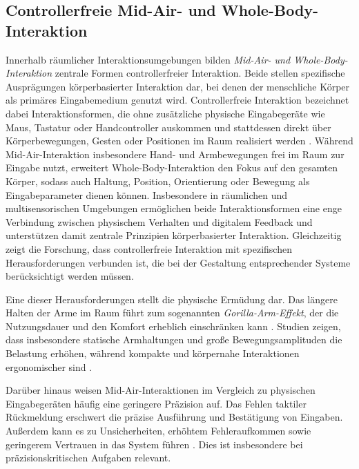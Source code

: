 \subsection{Controllerfreie Mid-Air- und Whole-Body-Interaktion}
\label{sec:rw_midair}
Innerhalb räum\-licher Interaktionsumgebungen bilden \textit{Mid-Air- und Whole-Body-}\-\textit{Interaktion} zentrale Formen controllerfreier Interaktion. Beide stellen spezifische Ausprägungen körper\-basierter Interaktion dar, bei denen der menschliche Körper als primäres Eingabemedium genutzt wird. Controllerfreie Interaktion bezeichnet dabei Interaktionsformen, die ohne zusätzliche physische Eingabegeräte wie Maus, Tastatur oder Handcontroller auskommen und stattdessen direkt über Körperbewegungen, Gesten oder Positionen im Raum realisiert werden \parencite{spittle2023reviewinteractiontechniquesforimmersiveenvironments, gavgiotaki2023gesturebasedinteractionforarsystemsreview}. Während Mid-Air-Interaktion insbesondere Hand- und Armbewegungen frei im Raum zur Eingabe nutzt, erweitert Whole-Body-Interaktion den Fokus auf den gesamten Körper, sodass auch Haltung, Position, Orientierung oder Bewegung als Eingabeparameter dienen können.
Insbesondere in räumlichen und multisensorischen Umgebungen ermög\-lichen beide Interaktionsformen eine enge Verbindung zwischen physischem Verhalten und digitalem Feedback und unterstützen damit zentrale Prinzipien körper\-basierter Interaktion.
Gleichzeitig zeigt die Forschung, dass controllerfreie Interaktion mit spezifischen Herausforderungen verbunden ist, die bei der Gestaltung entsprechender Systeme berücksichtigt werden müssen.

Eine dieser Herausforderungen stellt die physische Ermüdung dar. Das längere Halten der Arme im Raum führt zum sogenannten \textit{Gorilla-Arm-Effekt}, der die Nutzungsdauer und den Komfort erheblich einschränken kann \parencite{hincapi2014metrictoquantifyarmfatigue, spittle2023reviewinteractiontechniquesforimmersiveenvironments}. Studien zeigen, dass insbesondere statische Armhaltungen und große Bewegungsamplituden die Belastung erhöhen, während kompakte und körpernahe Interaktionen ergonomischer sind \parencite{hincapi2014metrictoquantifyarmfatigue}.

Darüber hinaus weisen Mid-Air-Interaktionen im Vergleich zu physischen Eingabegeräten häufig eine geringere Präzision auf. Das Fehlen taktiler Rückmeldung erschwert die präzise Ausführung und Bestätigung von Eingaben. Außerdem kann es zu Unsicherheiten, erhöhtem Fehleraufkommen sowie geringerem Vertrauen in das System führen \parencite{spittle2023reviewinteractiontechniquesforimmersiveenvironments, vona2025handsvscontrollerscomparing}. Dies ist insbesondere bei präzisionskritischen Aufgaben relevant.

